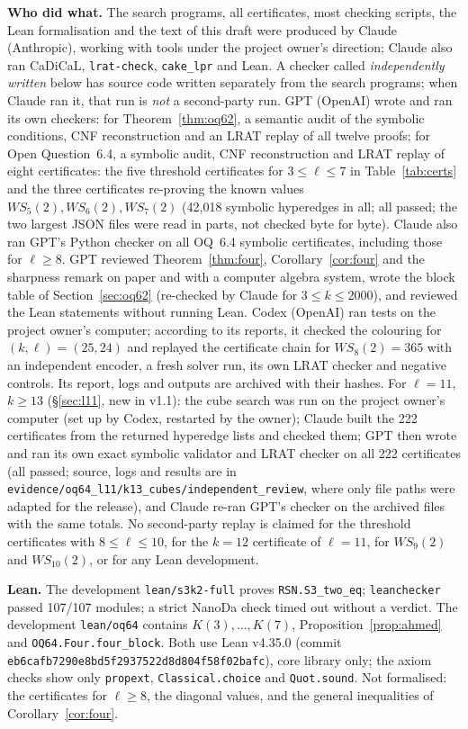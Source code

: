 \documentclass[11pt]{amsart}
\theoremstyle{definition}
\begin{document}
\smallskip\noindent\textbf{Who did what.} The search programs, all certificates, most checking scripts, the Lean formalisation and the text of this draft were produced by Claude (Anthropic), working with tools under the project owner's direction; Claude also ran CaDiCaL, \texttt{lrat-check}, \texttt{cake\_lpr} and Lean. A checker called \emph{independently written} below has source code written separately from the search programs; when Claude ran it, that run is \emph{not} a second-party run.
GPT (OpenAI) wrote and ran its own checkers: for Theorem~\ref{thm:oq62}, a semantic audit of the symbolic conditions, CNF reconstruction and an LRAT replay of all twelve proofs; for Open Question~6.4, a symbolic audit, CNF reconstruction and LRAT replay of eight certificates: the five threshold certificates for $3\le\ell\le7$ in Table~\ref{tab:certs} and the three certificates re-proving the known values $WS_5(2),WS_6(2),WS_7(2)$ (42{,}018 symbolic hyperedges in all; all passed; the two largest JSON files were read in parts, not checked byte for byte). Claude also ran GPT's Python checker on all OQ~6.4 symbolic certificates, including those for $\ell\ge8$. GPT reviewed Theorem~\ref{thm:four}, Corollary~\ref{cor:four} and the sharpness remark on paper and with a computer algebra system, wrote the block table of Section~\ref{sec:oq62} (re-checked by Claude for $3\le k\le2000$), and reviewed the Lean statements without running Lean.
Codex (OpenAI) ran tests on the project owner's computer; according to its reports, it checked the colouring for $(k,\ell)=(25,24)$ and replayed the certificate chain for $WS_8(2)=365$ with an independent encoder, a fresh solver run, its own LRAT checker and negative controls. Its report, logs and outputs are archived with their hashes. For $\ell=11$, $k\ge13$ (\S\ref{sec:l11}, new in v1.1): the cube search was run on the project owner's computer (set up by Codex, restarted by the owner); Claude built the 222 certificates from the returned hyperedge lists and checked them; GPT then wrote and ran its own exact symbolic validator and LRAT checker on all 222 certificates (all passed; source, logs and results are in \texttt{evidence/oq64\_l11/k13\_cubes/independent\_review}, where only file paths were adapted for the release), and Claude re-ran GPT's checker on the archived files with the same totals. No second-party replay is claimed for the threshold certificates with $8\le\ell\le10$, for the $k=12$ certificate of $\ell=11$, for $WS_9(2)$ and $WS_{10}(2)$, or for any Lean development.


\smallskip\noindent\textbf{Lean.} The development \texttt{lean/s3k2-full} proves \texttt{RSN.S3\_two\_eq}; \texttt{leanchecker} passed 107/107 modules; a strict NanoDa check timed out without a verdict. The development \texttt{lean/oq64} contains $K(3),\dots,K(7)$, Proposition~\ref{prop:ahmed} and \texttt{OQ64.Four.four\_block}. Both use Lean v4.35.0 (commit \texttt{eb6cafb7290e8bd5f2937522d8d804f58f02bafc}), core library only; the axiom checks show only \texttt{propext}, \texttt{Classical.choice} and \texttt{Quot.sound}. Not formalised: the certificates for $\ell\ge8$, the diagonal values, and the general inequalities of Corollary~\ref{cor:four}.
\end{document}
